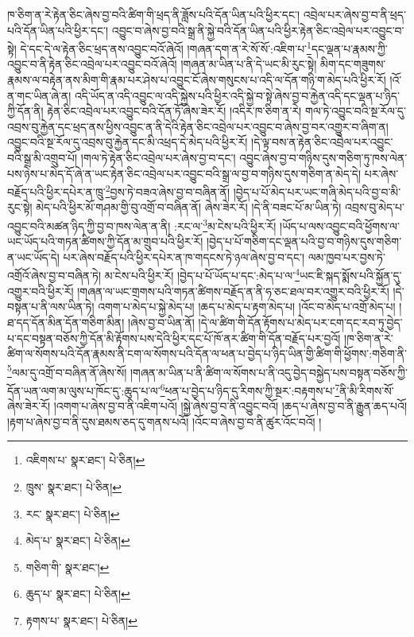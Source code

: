 ཁ་ཅིག་ན་རེ་རྟེན་ཅིང་ཞེས་བྱ་བའི་ཚིག་གི་ཕྲད་ནི་ཟློས་པའི་དོན་ཡིན་པའི་ཕྱིར་དང་། འབྲེལ་པར་ཞེས་བྱ་བ་ནི་ཕྲད་པའི་དོན་ཡིན་པའི་ཕྱིར་དང་། འབྱུང་བ་ཞེས་བྱ་བའི་སྒྲ་ནི་སྐྱེ་བའི་དོན་ཡིན་པའི་ཕྱིར་རྟེན་ཅིང་འབྲེལ་པར་འབྱུང་བ་སྟེ། དེ་དང་དེ་ལ་རྟེན་ཅིང་ཕྲད་ནས་འབྱུང་བའོ་ཞེའོ། །གཞན་དག་ན་རེ་སོ་སོ་:འཇིག་པ་\footnote{འཇིགས་པ་  སྣར་ཐང་།  པེ་ཅིན། }དང་ལྡན་པ་རྣམས་ཀྱི་འབྱུང་བ་ནི་རྟེན་ཅིང་འབྲེལ་པར་འབྱུང་བའོ་ཞེའོ། །གཞན་མ་ཡིན་པ་ནི་དེ་ཡང་མི་རུང་སྟེ། མིག་དང་གཟུགས་རྣམས་ལ་བརྟེན་ནས་མིག་གི་རྣམ་པར་ཤེས་པ་འབྱུང་ངོ་ཞེས་གསུངས་པ་འདི་ལ་དོན་གཉི་ག་མེད་པའི་ཕྱིར་རོ། །འོ་ན་གང་ཡིན་ཞེ་ན། འདི་ཡོད་ན་འདི་འབྱུང་ལ་འདི་སྐྱེས་པའི་ཕྱིར་འདི་སྐྱེ་བ་སྟེ་ཞེས་བྱ་བ་རྐྱེན་འདི་དང་ལྡན་པ་ཉིད་ཀྱི་དོན་ནི། རྟེན་ཅིང་འབྲེལ་པར་འབྱུང་བའི་དོན་ཏོ་ཞེས་ཟེར་རོ། །འདིར་ཁ་ཅིག་ན་རེ། གལ་ཏེ་འབྱུང་བའི་སྔ་རོལ་དུ་འབྲས་བུ་རྐྱེན་དང་ཕྲད་ནས་ཕྱིས་འབྱུང་ན་ནི་དེའི་རྟེན་ཅིང་འབྲེལ་པར་འབྱུང་བ་ཞེས་བྱ་བར་འགྱུར་བ་ཞིག་ན། འབྱུང་བའི་སྔ་རོལ་དུ་འབྲས་བུ་རྐྱེན་དང་མི་འཕྲད་དེ་མེད་པའི་ཕྱིར་རོ། །དེ་ལྟ་བས་ན་རྟེན་ཅིང་འབྲེལ་པར་འབྱུང་བའི་སྒྲ་མི་འགྲུབ་པོ། །གལ་ཏེ་རྟེན་ཅིང་འབྲེལ་པར་ཞེས་བྱ་བ་དང་། འབྱུང་ཞེས་བྱ་བ་གཉིས་དུས་གཅིག་ཏུ་ཁས་ལེན་པས་ཉེས་པ་མེད་དོ་ཞེ་ན་ཡང་རྟེན་ཅིང་འབྲེལ་པར་འབྱུང་བའི་སྒྲ་ལ་བྱ་བ་གཉིས་དུས་གཅིག་ན་མེད་དེ། པར་ཞེས་བརྗོད་པའི་ཕྱིར་དཔེར་ན་ཁྲུ་\footnote{ཁྲུས་  སྣར་ཐང་།  པེ་ཅིན། }བྱས་ཏེ་བཟའ་ཞེས་བྱ་བ་བཞིན་ནོ། །བྱེད་པ་པོ་མེད་པར་ཡང་གཞི་མེད་པའི་བྱ་བ་མི་རུང་སྟེ། མེད་པའི་ཕྱིར་མོ་གཤམ་གྱི་བུ་འགྲོ་བ་བཞིན་ནོ། ཞེས་ཟེར་རོ། །དེ་ནི་བཟང་པོ་མ་ཡིན་ཏེ། འབྲས་བུ་མེད་པ་འབྱུང་བའི་མཚན་ཉིད་ཀྱི་བྱ་བ་ཁས་ལེན་ན་ནི། :རང་ལ་\footnote{རང་  སྣར་ཐང་།  པེ་ཅིན། }མ་ངེས་པའི་ཕྱིར་རོ། །ཡོད་པ་ལས་འབྱུང་བའི་ཕྱོགས་ལ་ཡང་ཡོད་པའི་གཏན་ཚིགས་ཀྱི་དོན་མ་གྲུབ་པའི་ཕྱིར་རོ། །བྱེད་པ་པོ་གཅིག་དང་ལྡན་པའི་བྱ་བ་གཉིས་དུས་གཅིག་ན་ཡང་ཡོད་དེ། པར་ཞེས་བརྗོད་པའི་ཕྱིར་དཔེར་ན་ཁ་གདངས་ཏེ་ཉལ་ཞེས་བྱ་བ་དང་། ལམ་ཁྱབ་པར་བྱས་ཏེ་འགྲོའོ་ཞེས་བྱ་བ་བཞིན་ཏེ། མ་ངེས་པའི་ཕྱིར་རོ། །བྱེད་པ་པོ་ཡོད་པ་དང་:མེད་པ་ལ་\footnote{མེད་པ་  སྣར་ཐང་།  པེ་ཅིན། }ཡང་ཇི་སྐད་སྨོས་པའི་སྐྱོན་དུ་འགྱུར་བའི་ཕྱིར་རོ། །གཞན་ལ་ཡང་གྲགས་པའི་གཏན་ཚིགས་བརྗོད་ན་ནི་ཧ་ཅང་ཐལ་བར་འགྱུར་བའི་ཕྱིར་རོ། །དེ་བསྟན་པ་ནི་ལས་ཡིན་ཏེ། འགག་པ་མེད་པ་སྐྱེ་མེད་པ། །ཆད་པ་མེད་པ་རྟག་མེད་པ། །འོང་བ་མེད་པ་འགྲོ་མེད་པ། །ཐ་དད་དོན་མིན་དོན་གཅིག་མིན། །ཞེས་བྱ་བ་ཡིན་ནོ། །དེ་ལ་ཚིག་གི་དོན་རྟོགས་པ་མེད་པར་ངག་དང་རབ་ཏུ་བྱེད་པ་དང་བསྟན་བཅོས་ཀྱི་དོན་མི་རྟོགས་པས་དེའི་ཕྱིར་དང་པོ་ཁོ་ནར་ཚིག་གི་དོན་བརྗོད་པར་བྱའོ། །ཁ་ཅིག་ན་རེ་ཚིག་ལ་སོགས་པའི་དོན་རྣམས་ནི་ངག་ལ་སོགས་པའི་དོན་ལ་ཕན་པ་བྱེད་པ་ཉིད་ཡིན་གྱི་ཚིག་གི་ཕྱོགས་:གཅིག་ནི་\footnote{གཅིག་གི་  སྣར་ཐང་། }ལམ་དུ་འགྲོ་བ་བཞིན་ནོ་ཞེས་སོ། །གཞན་མ་ཡིན་པ་ནི་ཚིག་ལ་སོགས་པ་ནི་འདུ་བྱེད་བསྐྱེད་པས་བསྟན་བཅོས་ཀྱི་དོན་ཡན་ལག་མ་ལུས་པ་ཁོང་དུ་:ཆུད་པ་ལ་\footnote{ཆུད་པ་  སྣར་ཐང་།  པེ་ཅིན། }ཕན་པ་བྱེད་པ་ཉིད་དུ་རིགས་ཀྱི་སྔར་:བརྟགས་པ་\footnote{རྟགས་པ་  སྣར་ཐང་།  པེ་ཅིན། }ནི་མི་རིགས་སོ་ཞེས་ཟེར་རོ། །འགག་པ་ཞེས་བྱ་བ་ནི་འཇིག་པའོ། །སྐྱེ་ཞེས་བྱ་བ་ནི་འབྱུང་བའོ། །ཆད་པ་ཞེས་བྱ་བ་ནི་རྒྱུན་ཆད་པའོ། །རྟག་པ་ཞེས་བྱ་བ་ནི་དུས་ཐམས་ཅད་དུ་གནས་པའོ། །འོང་བ་ཞེས་བྱ་བ་ནི་ཚུར་འོང་བའོ། །

